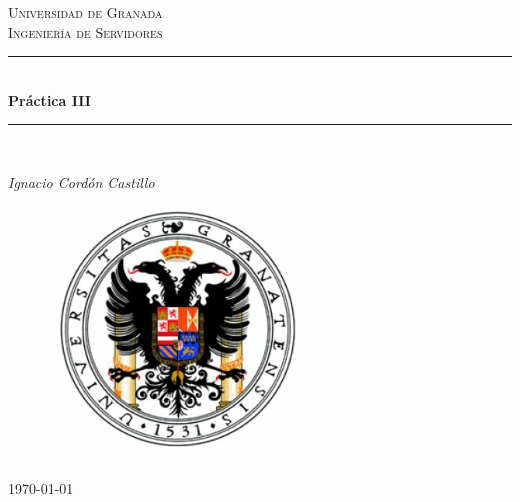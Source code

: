 \documentclass[a4paper,10pt]{article}
\begin{document}
\begin{titlepage}

\newcommand{\HRule}{\rule{\linewidth}{0.5mm}} %

\center %
 
\textsc{\LARGE Universidad de Granada}\\[1.5cm]
\textsc{\Large Ingeniería de Servidores}\\[0.5cm] 

\bigskip
\HRule \\[0.4cm]
{ \huge \bfseries Práctica III}\\[0.4cm] %
\HRule \\[1.5cm]
 

\begin{minipage}{0.4\textwidth}
\begin{center} \large
\emph{Ignacio Cordón Castillo}\\
\end{center}
\end{minipage}


\begin{center}
\includegraphics[width=9cm]{../images/ugr.jpg}
\end{center}

\vspace{\fill}%
\large\today
\end{titlepage}  
\end{document}
